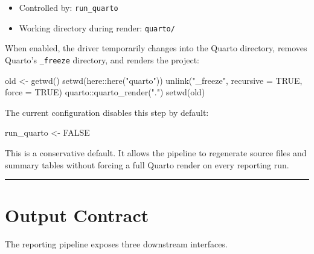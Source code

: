 \documentclass[
  letterpaper,
  DIV=11,
  numbers=noendperiod,
  openany,
  oneside]{scrreprt}
\newenvironment{Shaded}{\begin{snugshade}}{\end{snugshade}}
\newcommand{\AttributeTok}[1]{\textcolor[rgb]{0.40,0.45,0.13}{#1}}
\newcommand{\ConstantTok}[1]{\textcolor[rgb]{0.56,0.35,0.01}{#1}}
\newcommand{\FunctionTok}[1]{\textcolor[rgb]{0.28,0.35,0.67}{#1}}
\newcommand{\NormalTok}[1]{\textcolor[rgb]{0.00,0.23,0.31}{#1}}
\newcommand{\OtherTok}[1]{\textcolor[rgb]{0.00,0.23,0.31}{#1}}
\newcommand{\SpecialCharTok}[1]{\textcolor[rgb]{0.37,0.37,0.37}{#1}}
\newcommand{\StringTok}[1]{\textcolor[rgb]{0.13,0.47,0.30}{#1}}
\providecommand{\tightlist}{%
  \setlength{\itemsep}{0pt}\setlength{\parskip}{0pt}}
\begin{document}
\begin{itemize}
\tightlist
\item
  Controlled by: \texttt{run\_quarto}
\item
  Working directory during render: \texttt{quarto/}
\end{itemize}

When enabled, the driver temporarily changes into the Quarto directory,
removes Quarto's \texttt{\_freeze} directory, and renders the project:

\begin{Shaded}
\begin{Highlighting}[]
\NormalTok{old }\OtherTok{\textless{}{-}} \FunctionTok{getwd}\NormalTok{()}
\FunctionTok{setwd}\NormalTok{(here}\SpecialCharTok{::}\FunctionTok{here}\NormalTok{(}\StringTok{"quarto"}\NormalTok{))}
\FunctionTok{unlink}\NormalTok{(}\StringTok{"\_freeze"}\NormalTok{, }\AttributeTok{recursive =} \ConstantTok{TRUE}\NormalTok{, }\AttributeTok{force =} \ConstantTok{TRUE}\NormalTok{)}
\NormalTok{quarto}\SpecialCharTok{::}\FunctionTok{quarto\_render}\NormalTok{(}\StringTok{"."}\NormalTok{)}
\FunctionTok{setwd}\NormalTok{(old)}
\end{Highlighting}
\end{Shaded}

The current configuration disables this step by default:

\begin{Shaded}
\begin{Highlighting}[]
\NormalTok{run\_quarto }\OtherTok{\textless{}{-}} \ConstantTok{FALSE}
\end{Highlighting}
\end{Shaded}

This is a conservative default. It allows the pipeline to regenerate
source files and summary tables without forcing a full Quarto render on
every reporting run.

\begin{center}\rule{0.5\linewidth}{0.5pt}\end{center}

\section*{Output Contract}\label{output-contract-1}


The reporting pipeline exposes three downstream interfaces.
\end{document}
